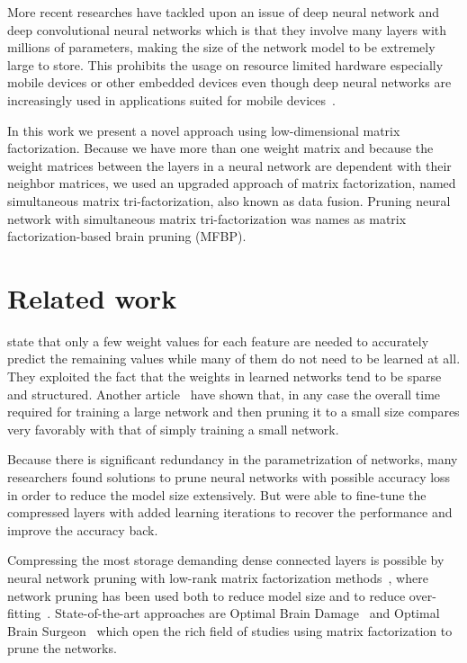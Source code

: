 \documentclass{article} %
\begin{document}
More recent researches have tackled upon an issue of deep neural network and
deep convolutional neural networks which is that they involve many layers with
millions of parameters, making the size of the network model to be extremely
large to store. This prohibits the usage on resource limited hardware
especially mobile devices or other embedded devices even though deep neural
networks are increasingly used in applications suited for mobile
devices~\cite{DBLP:journals/corr/GongLYB14}.

In this work we present a novel approach using low-dimensional matrix
factorization. Because we have more than one weight matrix and because the
weight matrices between the layers in a neural network are dependent with their
neighbor matrices, we used an upgraded approach of matrix factorization, named
simultaneous matrix tri-factorization, also known as data fusion. Pruning
neural network with simultaneous matrix tri-factorization was names as matrix
factorization-based brain pruning (MFBP).


\section{Related work}

\cite{denil2013predicting} state that only a few weight values for each
feature are needed to accurately predict the remaining values while many of
them do not need to be learned at all. They exploited the fact that the weights
in learned networks tend to be sparse and structured. Another
article~\cite{augasta2013pruning} have shown that, in any case the overall time
required for training a large network and then pruning it to a small size
compares very favorably with that of simply training a small network.

Because there is significant redundancy in the parametrization of networks,
many researchers found solutions to prune neural networks with possible
accuracy loss in order to reduce the model size extensively. But were able to
fine-tune the compressed layers with added learning iterations to recover the
performance and improve the accuracy back.

Compressing the most storage demanding dense connected layers is possible by
neural network pruning with low-rank matrix factorization
methods~\cite{bondarenko2014artificial, schmidhuber2015deep, sainath2013low},
where network pruning has been used both to reduce model size and to reduce
over-fitting~\cite{han2015learning}. State-of-the-art approaches are Optimal
Brain Damage~\cite{lecun1989optimal} and Optimal Brain
Surgeon~\cite{hassibi1993optimal} which open the rich field of studies using
matrix factorization to prune the networks.
\end{document}

